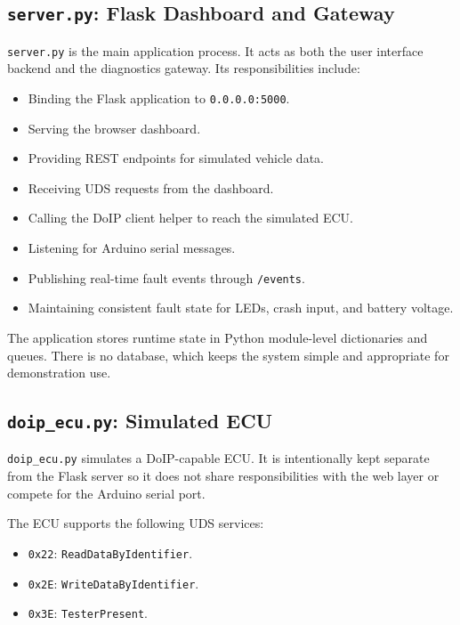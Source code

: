 \documentclass[a4paper,10pt,titlepage,oneside]{article}
\begin{document}
\subsection{\texttt{server.py}: Flask Dashboard and Gateway}

\texttt{server.py} is the main application process. It acts as both the user
interface backend and the diagnostics gateway. Its responsibilities include:

\begin{itemize}[leftmargin=*]
    \item Binding the Flask application to \texttt{0.0.0.0:5000}.
    \item Serving the browser dashboard.
    \item Providing REST endpoints for simulated vehicle data.
    \item Receiving UDS requests from the dashboard.
    \item Calling the DoIP client helper to reach the simulated ECU.
    \item Listening for Arduino serial messages.
    \item Publishing real-time fault events through \texttt{/events}.
    \item Maintaining consistent fault state for LEDs, crash input, and battery voltage.
\end{itemize}

The application stores runtime state in Python module-level dictionaries and
queues. There is no database, which keeps the system simple and appropriate for
demonstration use.

\subsection{\texttt{doip\_ecu.py}: Simulated ECU}

\texttt{doip\_ecu.py} simulates a DoIP-capable ECU. It is intentionally kept
separate from the Flask server so it does not share responsibilities with the
web layer or compete for the Arduino serial port.

The ECU supports the following UDS services:

\begin{itemize}[leftmargin=*]
    \item \texttt{0x22}: \texttt{ReadDataByIdentifier}.
    \item \texttt{0x2E}: \texttt{WriteDataByIdentifier}.
    \item \texttt{0x3E}: \texttt{TesterPresent}.
\end{itemize}
\end{document}
